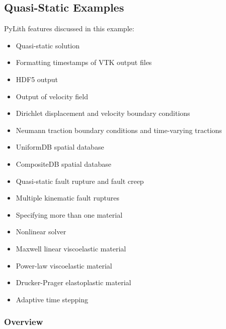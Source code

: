 \subsection{Quasi-Static Examples}
\label{sec:example:3dhex8-quasistatic}

PyLith features discussed in this example:
\begin{itemize}
\item Quasi-static solution
\item Formatting timestamps of VTK output files
\item HDF5 output
\item Output of velocity field
\item Dirichlet displacement and velocity boundary conditions
\item Neumann traction boundary conditions and time-varying tractions
\item UniformDB spatial database
\item CompositeDB spatial database
\item Quasi-static fault rupture and fault creep
\item Multiple kinematic fault ruptures
\item Specifying more than one material
\item Nonlinear solver
\item Maxwell linear viscoelastic material
\item Power-law viscoelastic material
\item Drucker-Prager elastoplastic material
\item Adaptive time stepping
\end{itemize}

\subsubsection{Overview}

